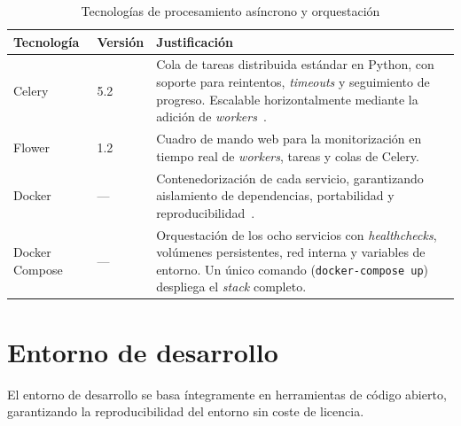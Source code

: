 \begin{table}[htbp]
  \centering
  \caption{Tecnologías de procesamiento asíncrono y orquestación}
  \label{tab:tech-async}
  \begin{tabularx}{\textwidth}{l l X}
    \toprule
    \textbf{Tecnología} & \textbf{Versión} & \textbf{Justificación} \\
    \midrule
    Celery    & 5.2  & Cola de tareas distribuida estándar en Python, con
      soporte para reintentos, \emph{timeouts} y seguimiento de progreso.
      Escalable horizontalmente mediante la adición de
      \emph{workers}~\citep{celery}. \\
    Flower    & 1.2  & Cuadro de mando web para la monitorización en tiempo
      real de \emph{workers}, tareas y colas de Celery. \\
    Docker    & ---  & Contenedorización de cada servicio, garantizando
      aislamiento de dependencias, portabilidad y
      reproducibilidad~\citep{docker}. \\
    Docker Compose & --- & Orquestación de los ocho servicios con
      \emph{healthchecks}, volúmenes persistentes, red interna y variables de
      entorno.  Un único comando (\texttt{docker-compose~up}) despliega el
      \emph{stack} completo. \\
    \bottomrule
  \end{tabularx}
\end{table}

\section{Entorno de desarrollo}
\label{sec:entorno-desarrollo}

El entorno de desarrollo se basa íntegramente en herramientas de código
abierto, garantizando la reproducibilidad del entorno sin coste de
licencia.

